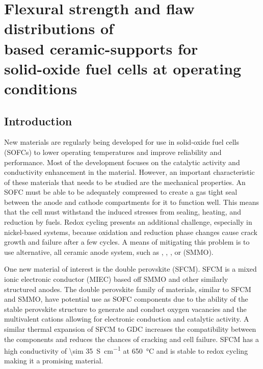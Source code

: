 
\chapter[Flexural strength and flaw distributions of \ce{SrFe_{0.2}Co_{0.4}Mo_{0.4}O_{3}} based ceramic-supports for solid-oxide fuel cells at operating conditions]{Flexural strength and flaw distributions of\\  based ceramic-supports for \\solid-oxide fuel cells at operating conditions}

\section{Introduction}
    New materials are regularly being developed for use in solid-oxide fuel cells (SOFCs) to lower operating temperatures and improve reliability and performance.\cite{Wachsman2011a}
    Most of the development focuses on the catalytic activity and conductivity enhancement in the material.
    However, an important characteristic of these materials that needs to be studied are the mechanical properties.
    An SOFC must be able to be adequately compressed to create a gas tight seal between the anode and cathode compartments for it to function well.
    This means that the cell must withstand the induced stresses from sealing, heating, and reduction by fuels.
    Redox cycling presents an additional challenge, especially in nickel-based systems, because oxidation and reduction phase changes cause crack growth and failure after a few cycles.\cite{Radovic2004, Radovic2004b, Laurencin2010, Pihlatie2009, Laurencin2009, Yu2007, Sarantaridis2007}
    A means of mitigating this problem is to use alternative, all ceramic anode system, such as , , , or  (SMMO).\cite{Goodenough2007,Zha2005,Primdahl2001,Hussain2013,MohammedHussain2012,Hussain2016,Huang2006}

    One new material of interest is the double perovskite  (SFCM).\cite{Hussain,Hussaina,Pan}
    SFCM is a mixed ionic electronic conductor (MIEC) based off SMMO and other similarly structured anodes.
    The double perovskite family of materials, similar to SFCM and SMMO, have potential use as SOFC components due to the ability of the stable perovskite structure to generate and conduct oxygen vacancies and the multivalent cations allowing for electronic conduction and catalytic activity. \cite{Bernuy-Lopez2007, Huang2006a, Zhang2012}
    A similar thermal expansion of SFCM to GDC increases the compatibility between the components and reduces the chances of cracking and cell failure.
    SFCM has a high conductivity of \SI{\sim 35}{S\per\centi\meter} at \SI{650}{\celsius} and is stable to redox cycling making it a promising material.

